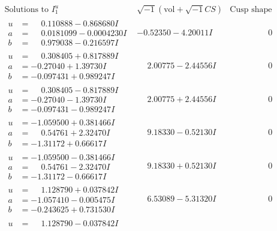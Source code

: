 \documentclass[1p]{elsarticle_modified}
\theoremstyle{definition}
\newcommand{\I}{\sqrt{-1}}
\begin{document}
$$\begin{array}{c|c|c}
\text{Solutions to }I^u_{1}& \I (\text{vol} + \sqrt{-1}CS) & \text{Cusp shape}\\
 \hline 
\begin{aligned}
u &= \phantom{-}0.110888 - 0.868680 I \\
a &= \phantom{-}0.0181099 - 0.0004230 I \\
b &= \phantom{-}0.979038 - 0.216597 I\end{aligned}
 & -0.52350 - 4.20011 I & \phantom{-0.000000 } 0 \\ \hline\begin{aligned}
u &= \phantom{-}0.308405 + 0.817889 I \\
a &= -0.27040 + 1.39730 I \\
b &= -0.097431 + 0.989247 I\end{aligned}
 & \phantom{-}2.00775 - 2.44556 I & \phantom{-0.000000 } 0 \\ \hline\begin{aligned}
u &= \phantom{-}0.308405 - 0.817889 I \\
a &= -0.27040 - 1.39730 I \\
b &= -0.097431 - 0.989247 I\end{aligned}
 & \phantom{-}2.00775 + 2.44556 I & \phantom{-0.000000 } 0 \\ \hline\begin{aligned}
u &= -1.059500 + 0.381466 I \\
a &= \phantom{-}0.54761 + 2.32470 I \\
b &= -1.31172 + 0.66617 I\end{aligned}
 & \phantom{-}9.18330 - 0.52130 I & \phantom{-0.000000 } 0 \\ \hline\begin{aligned}
u &= -1.059500 - 0.381466 I \\
a &= \phantom{-}0.54761 - 2.32470 I \\
b &= -1.31172 - 0.66617 I\end{aligned}
 & \phantom{-}9.18330 + 0.52130 I & \phantom{-0.000000 } 0 \\ \hline\begin{aligned}
u &= \phantom{-}1.128790 + 0.037842 I \\
a &= -1.057410 - 0.005475 I \\
b &= -0.243625 + 0.731530 I\end{aligned}
 & \phantom{-}6.53089 - 5.31320 I & \phantom{-0.000000 } 0 \\ \hline\begin{aligned}
u &= \phantom{-}1.128790 - 0.037842 I \\

\end{aligned}
\end{array}$$
\end{document}
